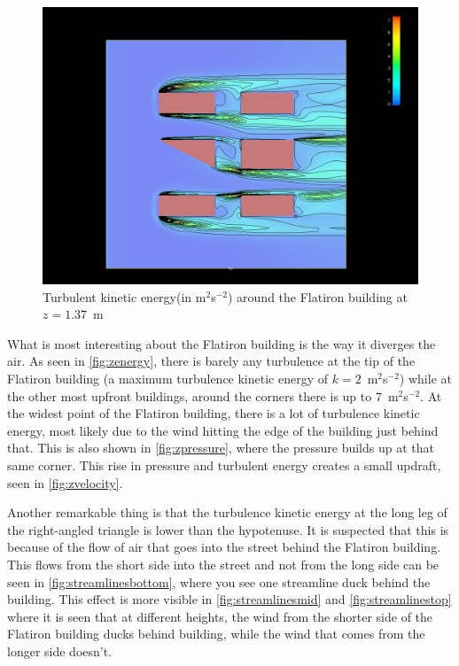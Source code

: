 \begin{figure}[htp]
\centering
\includegraphics[width = \textwidth]{zenergy.png}
\caption{Turbulent kinetic energy(in m$^2$s$^{-2}$) around the Flatiron building at $z=1.37$~m}
\label{fig:zenergy}
\end{figure}

What is most interesting about the Flatiron building is the way it diverges the air. As seen in \autoref{fig:zenergy}, there is barely any turbulence at the tip of the Flatiron building (a maximum turbulence kinetic energy of $k=2$~m$^2$s$^{-2}$) while at the other most upfront buildings, around the corners there is up to 7~m$^2$s$^{-2}$. At the widest point of the Flatiron building, there is a lot of turbulence kinetic energy, most likely due to the wind hitting the edge of the building just behind that. This is also shown in \autoref{fig:zpressure}, where the pressure builds up at that same corner. This rise in pressure and turbulent energy creates a small updraft, seen in \autoref{fig:zvelocity}.

Another remarkable thing is that the turbulence kinetic energy at the long leg of the right-angled triangle is lower than the hypotenuse. It is suspected that this is because of the flow of air that goes into the street behind the Flatiron building. This flows from the short side into the street and not from the long side can be seen in \autoref{fig:streamlinesbottom}, where you see one streamline duck behind the building. This effect is more visible in \autoref{fig:streamlinesmid} and \autoref{fig:streamlinestop} where it is seen that at different heights, the wind from the shorter side of the Flatiron building ducks behind building, while the wind that comes from the longer side doesn't. 